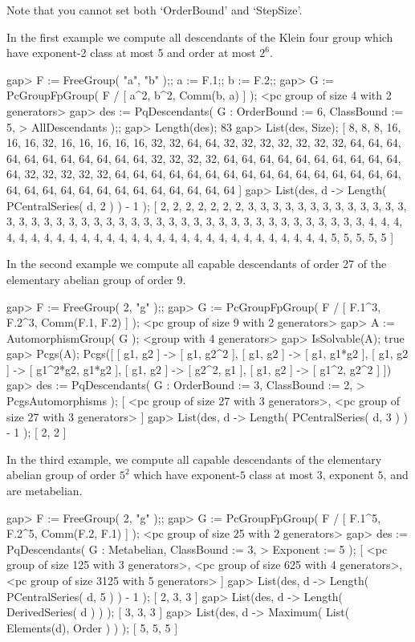 Note that you cannot set both `OrderBound' and `StepSize'.

In the first example  we  compute all descendants of the Klein four group
which have exponent-2 class at most 5 and order at most $2^6$.

\beginexample
gap> F := FreeGroup( "a", "b" );; a := F.1;; b := F.2;;         
gap> G := PcGroupFpGroup( F / [ a^2, b^2, Comm(b, a) ] );
<pc group of size 4 with 2 generators>
gap> des := PqDescendants( G : OrderBound := 6, ClassBound := 5,
>                              AllDescendants );;
gap> Length(des);
83
gap> List(des, Size); 
[ 8, 8, 8, 16, 16, 16, 32, 16, 16, 16, 16, 16, 32, 32, 64, 64, 32, 32, 32, 
  32, 32, 32, 32, 64, 64, 64, 64, 64, 64, 64, 64, 64, 64, 64, 32, 32, 32, 32, 
  64, 64, 64, 64, 64, 64, 64, 64, 64, 64, 64, 32, 32, 32, 32, 32, 64, 64, 64, 
  64, 64, 64, 64, 64, 64, 64, 64, 64, 64, 64, 64, 64, 64, 64, 64, 64, 64, 64, 
  64, 64, 64, 64, 64, 64, 64 ]
gap> List(des, d -> Length( PCentralSeries( d, 2 ) ) - 1 );
[ 2, 2, 2, 2, 2, 2, 2, 3, 3, 3, 3, 3, 3, 3, 3, 3, 3, 3, 3, 3, 3, 3, 3, 3, 3, 
  3, 3, 3, 3, 3, 3, 3, 3, 3, 3, 3, 3, 3, 3, 3, 3, 3, 3, 3, 3, 3, 3, 3, 3, 4, 
  4, 4, 4, 4, 4, 4, 4, 4, 4, 4, 4, 4, 4, 4, 4, 4, 4, 4, 4, 4, 4, 4, 4, 4, 4, 
  4, 4, 4, 5, 5, 5, 5, 5 ]
\endexample

In the second example we compute all  capable descendants of order  27 of
the  elementary abelian group of order 9.  

\beginexample
gap> F := FreeGroup( 2, "g" );;                                  
gap> G := PcGroupFpGroup( F / [ F.1^3, F.2^3, Comm(F.1, F.2) ] );
<pc group of size 9 with 2 generators>
gap> A := AutomorphismGroup( G );
<group with 4 generators>
gap> IsSolvable(A);
true
gap> Pcgs(A);
Pcgs([ [ g1, g2 ] -> [ g1, g2^2 ], [ g1, g2 ] -> [ g1, g1*g2 ], 
  [ g1, g2 ] -> [ g1^2*g2, g1*g2 ], [ g1, g2 ] -> [ g2^2, g1 ], 
  [ g1, g2 ] -> [ g1^2, g2^2 ] ])
gap> des := PqDescendants( G : OrderBound := 3, ClassBound := 2,
>                              PcgsAutomorphisms );
[ <pc group of size 27 with 3 generators>, 
  <pc group of size 27 with 3 generators> ]
gap> List(des, d -> Length( PCentralSeries( d, 3 ) ) - 1 );
[ 2, 2 ]
\endexample

In  the  third  example,  we  compute  all  capable  descendants  of  the
elementary abelian group of order  $5^2$ which have exponent-$5$ class at
most $3$, exponent $5$, and are metabelian.

\beginexample
gap> F := FreeGroup( 2, "g" );;                                  
gap> G := PcGroupFpGroup( F / [ F.1^5, F.2^5, Comm(F.2, F.1) ] );
<pc group of size 25 with 2 generators>
gap> des := PqDescendants( G : Metabelian, ClassBound := 3,
>                              Exponent := 5 );
[ <pc group of size 125 with 3 generators>, 
  <pc group of size 625 with 4 generators>, 
  <pc group of size 3125 with 5 generators> ]
gap> List(des, d -> Length( PCentralSeries( d, 5 ) ) - 1 );
[ 2, 3, 3 ]
gap> List(des, d -> Length( DerivedSeries( d ) ) );
[ 3, 3, 3 ]
gap> List(des, d -> Maximum( List( Elements(d), Order ) ) );     
[ 5, 5, 5 ]
\endexample

